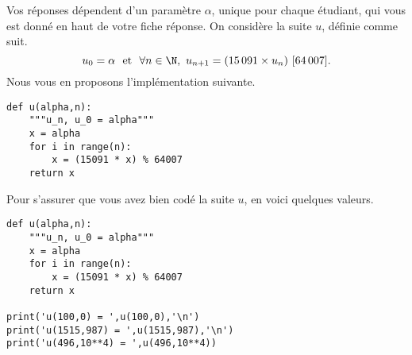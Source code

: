 
Vos réponses dépendent d'un paramètre $\alpha$, unique pour chaque étudiant, qui vous est donné en haut de votre fiche réponse. 
On considère la suite $u$, définie comme suit. 
\begin{equation*}
  u_0 = \alpha ~\textrm{ et }~ \forall n\in\N,~ u_{n+1} = (15\,091 \times u_n) ~[64\,007]. 
\end{equation*}
Nous vous en proposons l'implémentation suivante. 
\begin{lstlisting}
def u(alpha,n):
    """u_n, u_0 = alpha"""
    x = alpha
    for i in range(n):
        x = (15091 * x) % 64007
    return x
\end{lstlisting}
Pour s'assurer que vous avez bien codé la suite $u$, en voici quelques valeurs. \\
\indent
\begin{lstlisting}
def u(alpha,n):
    """u_n, u_0 = alpha"""
    x = alpha
    for i in range(n):
        x = (15091 * x) % 64007
    return x

print('u(100,0) = ',u(100,0),'\n')
print('u(1515,987) = ',u(1515,987),'\n')
print('u(496,10**4) = ',u(496,10**4))
\end{lstlisting}


